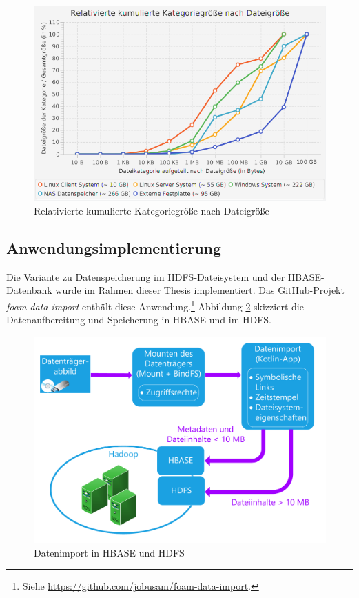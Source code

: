  \begin{figure}[ht]
  \centering
  \includegraphics[width=\textwidth]{./resource/fileSize_relativeCumulatedCategorieSize.png}
  \caption{Relativierte kumulierte Kategoriegröße nach Dateigröße}
  \label{fig:file_size_r_c_file_size}
\end{figure}

\subsection{Anwendungsimplementierung} 
\label{subsec:data_import_implementation}

Die Variante zu Datenspeicherung im HDFS-Dateisystem und der HBASE-Datenbank wurde im Rahmen dieser Thesis implementiert. Das GitHub-Projekt \textit{foam-data-import} enthält diese Anwendung.\footnote{Siehe \url{https://github.com/jobusam/foam-data-import}.} Abbildung \ref{fig:data_import} skizziert die Datenaufbereitung und Speicherung in HBASE und im HDFS.\\
\begin{figure}[ht]
  \centering
  \includegraphics[width=\textwidth]{./resource/storage_hdfs_and_hbase.pdf}
  \caption{Datenimport in HBASE und HDFS}
  \label{fig:data_import}
\end{figure}

